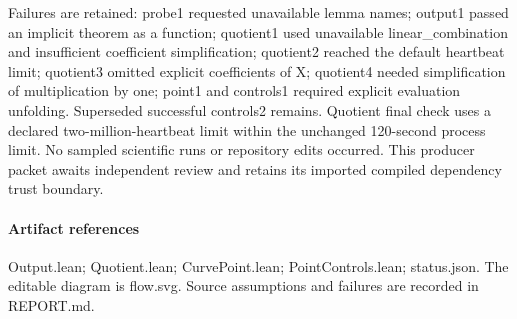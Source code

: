 \documentclass[11pt]{article}
\begin{document}
Failures are retained: probe1 requested unavailable lemma names; output1 passed an implicit theorem as a function; quotient1 used unavailable linear\_combination and insufficient coefficient simplification; quotient2 reached the default heartbeat limit; quotient3 omitted explicit coefficients of X; quotient4 needed simplification of multiplication by one; point1 and controls1 required explicit evaluation unfolding. Superseded successful controls2 remains. Quotient final check uses a declared two-million-heartbeat limit within the unchanged 120-second process limit. No sampled scientific runs or repository edits occurred. This producer packet awaits independent review and retains its imported compiled dependency trust boundary.\par\medskip
\paragraph{Artifact references} Output.lean; Quotient.lean; CurvePoint.lean; PointControls.lean; status.json. The editable diagram is flow.svg. Source assumptions and failures are recorded in REPORT.md.
\end{document}
